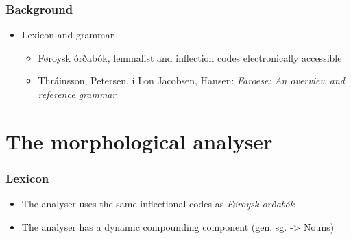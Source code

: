 \documentclass{beamer}
\begin{document}
\begin{frame}
\frametitle{Background}
\begin{itemize}
\item Lexicon and grammar
\begin{itemize}
\item Føroysk órðabók, lemmalist and inflection codes electronically accessible
\item Thráinsson, Petersen, í Lon Jacobsen, Hansen: \textit{Faroese: An overview and reference grammar}
\end{itemize}
\end{itemize}
\end{frame}






\section{The morphological analyser}
\begin{frame}
\frametitle{Lexicon}

\begin{itemize}
\item The analyser uses the same inflectional codes as  \textit{Føroysk orðabók} 
\item The analyser has a dynamic compounding component (gen. sg. -> Nouns)
\end{itemize}
\end{frame}

\end{document}
